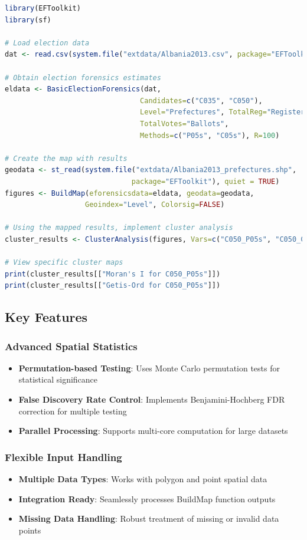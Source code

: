\documentclass{article}
\begin{document}
\begin{lstlisting}[language=R]
library(EFToolkit)
library(sf)

# Load election data
dat <- read.csv(system.file("extdata/Albania2013.csv", package="EFToolkit"))

# Obtain election forensics estimates
eldata <- BasicElectionForensics(dat,
                                Candidates=c("C035", "C050"),
                                Level="Prefectures", TotalReg="Registered",
                                TotalVotes="Ballots",
                                Methods=c("P05s", "C05s"), R=100)

# Create the map with results
geodata <- st_read(system.file("extdata/Albania2013_prefectures.shp", 
                              package="EFToolkit"), quiet = TRUE)
figures <- BuildMap(eforensicsdata=eldata, geodata=geodata, 
                   Geoindex="Level", Colorsig=FALSE)

# Using the mapped results, implement cluster analysis
cluster_results <- ClusterAnalysis(figures, Vars=c("C050_P05s", "C050_C05s"))

# View specific cluster maps
print(cluster_results[["Moran's I for C050_P05s"]])
print(cluster_results[["Getis-Ord for C050_P05s"]])
\end{lstlisting}

\subsection{Key Features}

\subsubsection{Advanced Spatial Statistics}
\begin{itemize}
    \item \textbf{Permutation-based Testing}: Uses Monte Carlo permutation tests for statistical significance
    \item \textbf{False Discovery Rate Control}: Implements Benjamini-Hochberg FDR correction for multiple testing
    \item \textbf{Parallel Processing}: Supports multi-core computation for large datasets
\end{itemize}

\subsubsection{Flexible Input Handling}
\begin{itemize}
    \item \textbf{Multiple Data Types}: Works with polygon and point spatial data
    \item \textbf{Integration Ready}: Seamlessly processes BuildMap function outputs
    \item \textbf{Missing Data Handling}: Robust treatment of missing or invalid data points
\end{itemize}
\end{document}
